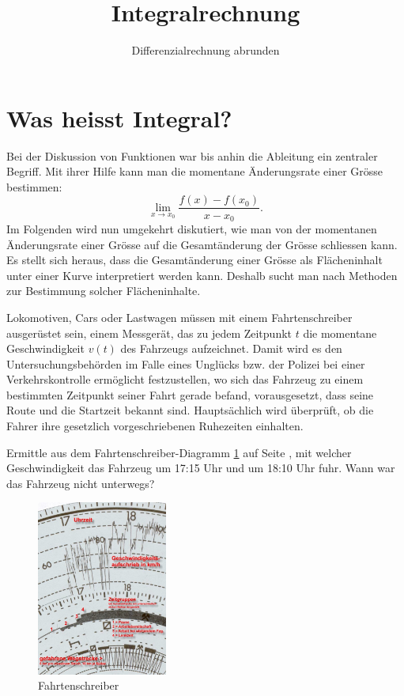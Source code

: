 \documentclass[%
11pt,%
twoside,%
titlepage,%
german,%
headsepline%
]{scrartcl}
\title{Integralrechnung}
\subtitle{Differenzialrechnung abrunden}
\author{}
\date{}
\begin{document}
\maketitle
\tableofcontents
\cleardoublepage

\section{Was heisst Integral?}

Bei der Diskussion von Funktionen war bis anhin die Ableitung ein zentraler Begriff. Mit ihrer Hilfe kann man die momentane Änderungsrate einer Grösse bestimmen:
$$\lim_{x\rightarrow x_0}\frac{f(x)-f(x_0)}{x-x_0}.$$
Im Folgenden wird nun umgekehrt diskutiert, wie man von der momentanen Änderungsrate einer Grösse auf die Gesamtänderung der Grösse schliessen kann. Es stellt sich heraus, dass die Gesamtänderung einer Grösse als Flächeninhalt unter einer Kurve interpretiert werden kann. Deshalb sucht man nach Methoden zur Bestimmung solcher Flächeninhalte.

Lokomotiven, Cars oder Lastwagen müssen mit einem Fahrtenschreiber ausgerüstet sein, einem Messgerät, das zu jedem Zeitpunkt $t$ die momentane Geschwindigkeit $v(t)$ des Fahrzeugs aufzeichnet. Damit wird es den Untersuchungsbehörden im Falle eines Unglücks bzw. der Polizei bei einer Verkehrskontrolle ermöglicht festzustellen, wo sich das Fahrzeug zu einem bestimmten Zeitpunkt seiner Fahrt gerade befand, vorausgesetzt, dass seine Route und die Startzeit bekannt sind. Hauptsächlich wird überprüft, ob die Fahrer ihre gesetzlich vorgeschriebenen Ruhezeiten einhalten.

\begin{ueb}[Fahrtenschreiber]
Ermittle aus dem Fahrtenschreiber-Diagramm \ref{abb:schreiber} auf Seite \pageref{abb:schreiber}, mit welcher Geschwindigkeit das Fahrzeug um 17:15 Uhr und um 18:10 Uhr fuhr. Wann war das Fahrzeug nicht unterwegs?
\begin{figure}[h!t]
\begin{center}
\includegraphics[width=0.381\textwidth]{pictures/tachozoom}
\end{center}
\caption{Fahrtenschreiber}\label{abb:schreiber}
\end{figure}
\end{ueb}
\end{document}
